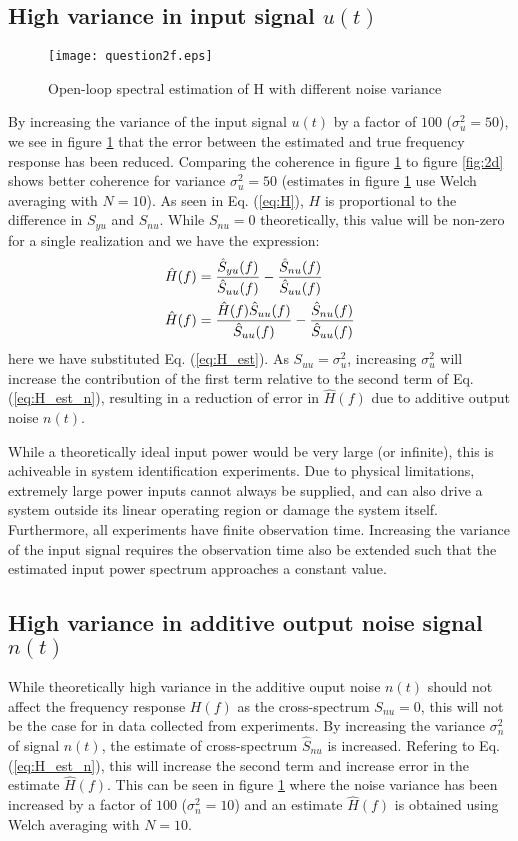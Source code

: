 \documentclass[11pt,a4paper]{article}
\begin{document}
\subsection{High variance in input signal $u(t)$}
\begin{figure}
    \begin{center}
        \texttt{[image: question2f.eps]}
    \end{center}
    \caption{Open-loop spectral estimation of H with different noise variance}
    \label{fig:2f}
\end{figure}
By increasing the variance of the input signal $u(t)$ by a factor of $100$
($\sigma_u^2 = 50$), we see in figure \ref{fig:2f} that the error between the
estimated and true frequency response has been reduced. Comparing the coherence
in figure \ref{fig:2f} to figure \ref{fig:2d} shows better coherence for
variance $\sigma_u^2 = 50$ (estimates in figure \ref{fig:2f} use Welch
averaging with $N = 10$). As seen in Eq. (\ref{eq:H}), $H$ is proportional to
the difference in $S_{yu}$ and $S_{nu}$. While $S_{nu} = 0$ theoretically, this
value will be non-zero for a single realization and we have the expression:
\begin{align}
    \hat{H}(f) &= \frac{\hat{S}_{yu}(f)}{\hat{S}_{uu}(f)}  -
    \frac{\hat{S}_{nu}(f)}{\hat{S}_{uu}(f)} \notag\\
    \hat{H}(f) &= \frac{\hat{H}(f)\hat{S}_{uu}(f)}{\hat{S}_{uu}(f)}  -
    \frac{\hat{S}_{nu}(f)}{\hat{S}_{uu}(f)}
    \label{eq:H_est_n}
\end{align}
here we have substituted Eq. (\ref{eq:H_est}). As $S_{uu} = \sigma_u^2$,
increasing $\sigma_u^2$ will increase the contribution of the first term
relative to the second term of Eq. (\ref{eq:H_est_n}), resulting in a reduction
of error in $\hat{H}(f)$ due to additive output noise $n(t)$.

While a theoretically ideal input power would be very large (or infinite), this
is achiveable in system identification experiments. Due to physical
limitations, extremely large power inputs cannot always be supplied, and can
also drive a system outside its linear operating region or damage the system
itself. Furthermore, all experiments have finite observation time. Increasing
the variance of the input signal requires the observation time also be extended
such that the estimated input power spectrum approaches a constant value.


\subsection{High variance in additive output noise signal $n(t)$}
While theoretically high variance in the additive ouput noise $n(t)$ should not
affect the frequency response $H(f)$ as the cross-spectrum $S_{nu} = 0$, this
will not be the case for in data collected from experiments. By increasing the
variance $\sigma_n^2$ of signal $n(t)$, the estimate of cross-spectrum
$\hat{S}_{nu}$ is increased. Refering to Eq. (\ref{eq:H_est_n}), this will
increase the second term and increase error in the estimate $\hat{H}(f)$. This
can be seen in figure \ref{fig:2f} where the noise variance has been increased
by a factor of $100$ ($\sigma_n^2 = 10$) and an estimate $\hat{H}(f)$ is
obtained using Welch averaging with $N = 10$.
\end{document}
